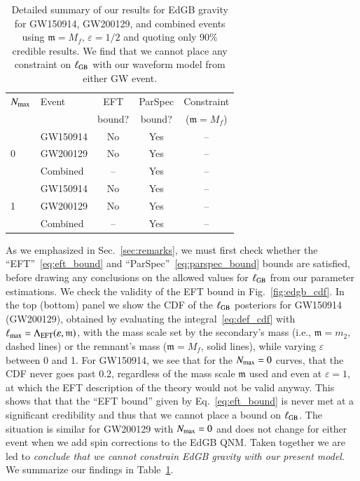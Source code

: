 \documentclass[twocolumn,
               prd,
               aps,
               superscriptaddress,
               tightenlines,
               nofootinbib,
               eqsecnum,
               amsfonts,
               amsmath,
               longbibliography]{revtex4-1}
\newcommand{\gm}{\mathfrak{m}}
\begin{document}
\begin{table}[h]
\begin{tabular}{l l c c c}
\hline
\hline
$N_{\rm max}$ & Event &  EFT    & ParSpec & Constraint      \\
              &       &  bound? & bound?  & ($\gm = M_{f}$) \\
\hline
  & GW150914 & No  & Yes & -- \\
0 & GW200129 & No  & Yes & -- \\
  & Combined & --  & Yes & -- \\
\hline
  & GW150914 & No  & Yes & -- \\
1 & GW200129 & No  & Yes & -- \\
  & Combined & --  & Yes & -- \\
\hline
\hline
\end{tabular}
\caption{Detailed summary of our results for EdGB gravity for GW150914, GW200129, and
combined events using $\gm = M_{f}$, $\varepsilon = 1/2$ and quoting only 90\% credible results.
%
We find that we cannot place any constraint on $\ell_{\rm GB}$ with our waveform model from either GW event.
}
\label{tab:summary_edgb}
\end{table}

As we emphasized in Sec.~\ref{sec:remarks}, we must first check whether the
``EFT''~\eqref{eq:eft_bound} and ``ParSpec''~\eqref{eq:parspec_bound} bounds
are satisfied, before drawing any conclusions on the allowed values for
$\ell_{\rm GB}$ from our parameter estimations.
%
We check the validity of the EFT bound in Fig.~\ref{fig:edgb_cdf}. In the top (bottom) panel we show
the CDF of the $\ell_{\rm GB}$ posteriors for GW150914 (GW200129), obtained
by evaluating the integral~\eqref{eq:def_cdf} with $\ell_{\rm max} = \Lambda_{\rm EFT}(\varepsilon, \mathfrak{m})$,
with the mass scale set by the secondary's mass (i.e., $\mathfrak{m} = m_2$, dashed lines) or
the remnant's mass ($\mathfrak{m} = M_f$, solid lines), while varying $\varepsilon$ between 0 and 1.
%
For GW150914, we see that for the $N_{\rm max} = 0$ curves, that the CDF never goes
past $0.2$, regardless of the mass scale $\mathfrak{m}$ used and even at $\varepsilon =
1$, at which the EFT description of the theory would not be valid anyway.
%
This shows that that the ``EFT bound'' given by Eq.~\eqref{eq:eft_bound} is
never met at a significant credibility and thus that we cannot place a bound on
$\ell_{\rm GB}$.
%
The situation is similar for GW200129 with $N_{\rm max} = 0$ and does not
change for either event when we add spin corrections to the EdGB QNM.
%
Taken together we are led to \emph{conclude that we cannot constrain EdGB gravity with our
present model}.
%
We summarize our findings in Table~\ref{tab:summary_edgb}.
\end{document}
